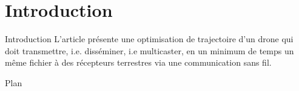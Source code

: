 
	
	\maketitle

\section {Introduction}

\begin{frame}{Introduction}
  L'article présente une optimisation de trajectoire d'un drone qui doit transmettre, i.e. disséminer, i.e multicaster,
  en un minimum de temps un même fichier à des récepteurs terrestres via une communication sans fil.
\end{frame}

\begin{frame}{Plan}

\tableofcontents

\end{frame}